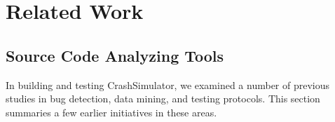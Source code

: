 \section{Related Work}
\label{SEC:related-work}

\subsection{Source Code Analyzing Tools}


In building and testing CrashSimulator, we examined a number of previous
studies in bug detection, data mining, and testing protocols. This section
summaries a few earlier initiatives in these areas.

\iffalse
While there is a vast literature on test
generation~\cite{ammann2008introduction, mcminn2004search,
  puasuareanu2009survey, dias2007survey}, much less work
has focused on issues of portability and testing whether software
behaves consistently in different environments.  Prior work on
CheckAPI~\cite{rasley2015detecting} and
NetCheck~\cite{Zhuang_NSDI_2014} begins to fill this gap and this paper
builds upon those results.
%
%


Crash reproduction by test case mutation~\cite{DBLP:conf/sigsoft/XuanXM15}.

\fi


